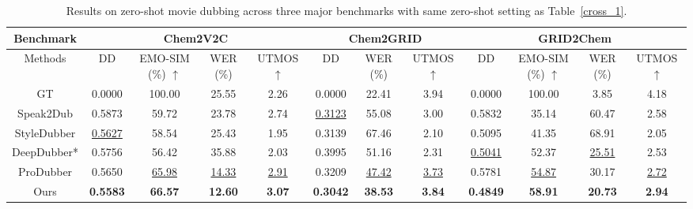 \begin{table}[!t]
  \centering
  \resizebox{1.0\linewidth}{!}
  {

    \begin{tabular}{c|cccc|ccc|cccc}
    \hline
    
    Benchmark & \multicolumn{4}{c|}{Chem2V2C} & \multicolumn{3}{c|}{Chem2GRID} & \multicolumn{4}{c}{GRID2Chem} \\
    \midrule
    Methods 
    & DD  
    & \small{EMO-SIM} (\%) $\uparrow$
    & WER (\%) 
    & \small{UTMOS} $\uparrow$   
    & DD  
    & WER (\%) 
    & \small{UTMOS} $\uparrow$   
    & DD  
    & \small{EMO-SIM} (\%) $\uparrow$
    & WER (\%) 
    & \small{UTMOS} $\uparrow$     \\
    \midrule
    GT  & 0.0000 & 100.00 & 25.55 & 2.26  & 0.0000 & 22.41 & 3.94 & 0.0000 & 100.00 & 3.85 & 4.18 \\
    \midrule
    Speak2Dub & 0.5873 & 59.72 & 23.78 & 2.74 & \underline{0.3123} & 55.08 & 3.00 & 0.5832 & 35.14 & 60.47 & 2.58 \\
    StyleDubber & \underline{0.5627} & 58.54 & 25.43 & 1.95 & 0.3139 & 67.46 & 2.10 & 0.5095 & 41.35 & 68.91 & 2.05 \\
    DeepDubber* & 0.5756 & 56.42 & 35.88 & 2.03 & 0.3995 & 51.16 & 2.31 & \underline{0.5041} & 52.37 & \underline{25.51} & 2.53 \\
    ProDubber & 0.5650 & \underline{65.98} & \underline{14.33} & \underline{2.91} & 0.3209 & \underline{47.42} & \underline{3.73} & 0.5781 & \underline{54.87} & 30.17 & \underline{2.72} \\
    \midrule
    Ours & \textbf{0.5583} & \textbf{66.57} & \textbf{12.60} & \textbf{3.07} & \textbf{0.3042} & \textbf{38.53} & \textbf{3.84} & \textbf{0.4849} & \textbf{58.91} & \textbf{20.73} & \textbf{2.94} \\
    \bottomrule
    \end{tabular}
    }
    \caption{
  Results on zero-shot movie dubbing across three major benchmarks with same zero-shot setting as Table~\ref{cross_1}.
  }
  
  \label{cross_2}%
\end{table}%